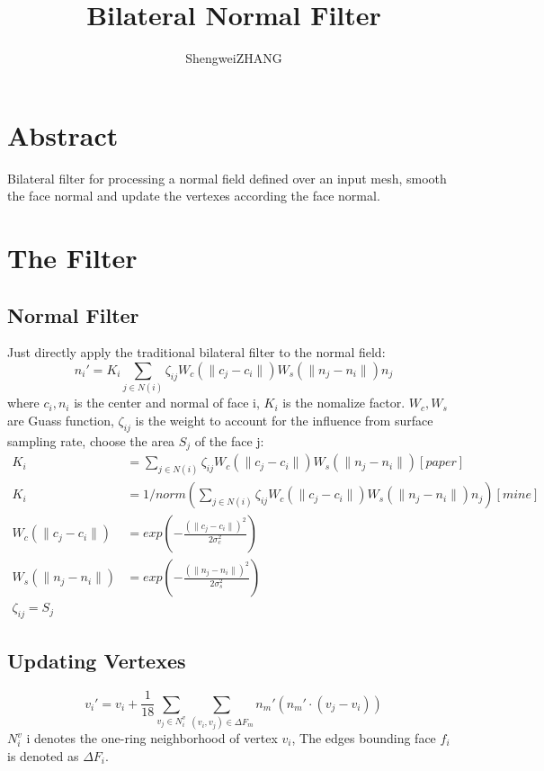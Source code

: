 \documentclass{article}
\title{Bilateral Normal Filter}
\author{ShengweiZHANG\\
}
\theoremstyle{definition}
\theoremstyle{remark}
\begin{document}
\maketitle

\section{Abstract}
Bilateral filter for processing a normal field defined over an input mesh, smooth the face normal and update the vertexes according the face normal.
\section{The Filter}
\subsection{Normal Filter}
Just directly apply the traditional bilateral filter to the normal field:
\begin{equation}
  n_i' = K_i \sum_{j\in N(i)} \zeta_{ij} W_c(\parallel c_j-c_i\parallel) W_s(\parallel n_j - n_i \parallel) n_j
\end{equation}
where $c_i, n_i$  is the center and normal of face i, $K_i$ is the nomalize factor. $W_c, W_s$ are Guass function, $\zeta_{ij}$ is the weight to account for the influence from surface sampling rate, choose the area $S_j$ of the face j:
\begin{equation}
  \begin{aligned}
    K_i &= \sum_{j\in N(i)} \zeta_{ij} W_c(\parallel c_j-c_i\parallel) W_s(\parallel n_j - n_i \parallel)  [paper]\\
    K_i &= 1/norm(\sum_{j\in N(i)} \zeta_{ij} W_c(\parallel c_j-c_i\parallel) W_s(\parallel n_j - n_i \parallel) n_j) [mine] \\
    W_c(\parallel c_j-c_i \parallel) &= exp(-\frac{(\parallel c_j-c_i \parallel)^2}{2\sigma_c^2})\\
    W_s(\parallel n_j-n_i \parallel) &= exp(-\frac{(\parallel n_j-n_i \parallel)^2} {2\sigma_s^2})\\
    \zeta_{ij} = S_j
  \end{aligned}
\end{equation}
\subsection{Updating Vertexes}
\begin{equation}
  v_i' = v_i + \frac{1}{18} \sum_{v_j \in N_i^v} \sum_{ (v_i, v_j) \in \Delta F_m} n_m'(n_m' \cdot (v_j - v_i))
\end{equation}
$N_i^v$ i denotes the one-ring neighborhood of vertex $v_i$, The edges bounding face $f_i$ is denoted as $\Delta F_i$.
\end{document}
